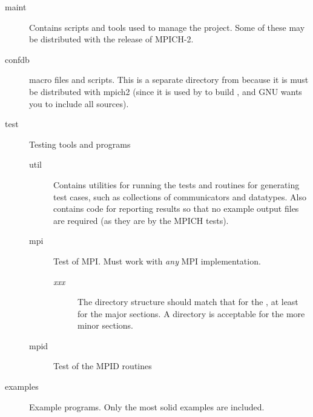 \documentclass{article}
\begin{document}
\begin{description}
\begin{description}
  \end{description}


\item[maint]
  Contains scripts and tools used to manage the project.  Some of these may be
  distributed with the release of MPICH-2.

\item[confdb] macro files and scripts.  This is a
separate directory from  because it is must be distributed
with mpich2 (since it is used by  to build
, and GNU wants you to include all sources).

\item[test]Testing tools and programs
  \begin{description}
    \item[util]Contains utilities for running the tests and routines
for generating test cases, such as collections of communicators and
datatypes.  Also contains code for reporting results so that no
example output files are required (as they are by the MPICH tests).
    \item[mpi]Test of MPI.  Must work with \emph{any} MPI implementation.
      \begin{description}
        \item[\emph{xxx}]The directory structure should match that for the
          , at least for the major sections.  A 
          directory is acceptable for the more minor sections.
      \end{description}
    \item[mpid]Test of the MPID routines
  \end{description}
\item[examples]Example programs.  Only the most solid examples are included.
\end{description}
\end{document}
